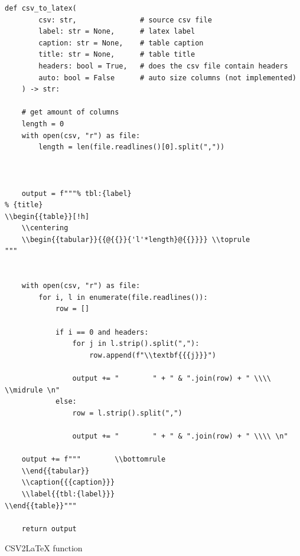 \documentclass[11pt]{article}
\begin{document}
        



        \newpage
        \begin{listing}[!h]
            \begin{verbatim}
def csv_to_latex(
        csv: str,               # source csv file
        label: str = None,      # latex label
        caption: str = None,    # table caption
        title: str = None,      # table title
        headers: bool = True,   # does the csv file contain headers
        auto: bool = False      # auto size columns (not implemented)
    ) -> str:
    
    # get amount of columns
    length = 0
    with open(csv, "r") as file:
        length = len(file.readlines()[0].split(","))
    
    
    
    output = f"""% tbl:{label}
% {title}
\\begin{{table}}[!h]
    \\centering
    \\begin{{tabular}}{{@{{}}{'l'*length}@{{}}}} \\toprule
"""
        
        
    with open(csv, "r") as file:
        for i, l in enumerate(file.readlines()):
            row = []
            
            if i == 0 and headers:
                for j in l.strip().split(","):
                    row.append(f"\\textbf{{{j}}}")
                    
                output += "        " + " & ".join(row) + " \\\\ \\midrule \n"
            else:
                row = l.strip().split(",")
                
                output += "        " + " & ".join(row) + " \\\\ \n"
                
    output += f"""        \\bottomrule
    \\end{{tabular}}
    \\caption{{{caption}}}
    \\label{{tbl:{label}}}
\\end{{table}}"""
    
    return output
            \end{verbatim}
            \caption{CSV2LaTeX function}
            \label{sc:csv2latex-func}
        \end{listing}
\end{document}
